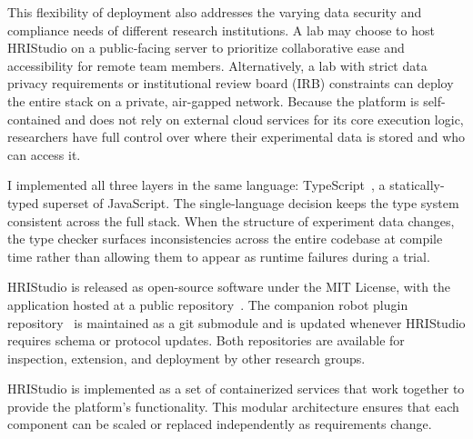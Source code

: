 This flexibility of deployment also addresses the varying data security and compliance needs of different research institutions. A lab may choose to host HRIStudio on a public-facing server to prioritize collaborative ease and accessibility for remote team members. Alternatively, a lab with strict data privacy requirements or institutional review board (IRB) constraints can deploy the entire stack on a private, air-gapped network. Because the platform is self-contained and does not rely on external cloud services for its core execution logic, researchers have full control over where their experimental data is stored and who can access it.

I implemented all three layers in the same language: TypeScript~\cite{TypeScript2014}, a statically-typed superset of JavaScript. The single-language decision keeps the type system consistent across the full stack. When the structure of experiment data changes, the type checker surfaces inconsistencies across the entire codebase at compile time rather than allowing them to appear as runtime failures during a trial.

HRIStudio is released as open-source software under the MIT License, with the application hosted at a public repository~\cite{HRIStudioRepo}. The companion robot plugin repository~\cite{RobotPluginsRepo} is maintained as a git submodule and is updated whenever HRIStudio requires schema or protocol updates. Both repositories are available for inspection, extension, and deployment by other research groups.

HRIStudio is implemented as a set of containerized services that work together to provide the platform's functionality. This modular architecture ensures that each component can be scaled or replaced independently as requirements change.

